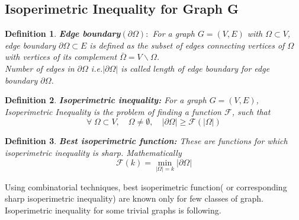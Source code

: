 \documentclass[oneside]{book}
\newtheorem{mydef}{Definition}[section]
\begin{document}
	
	 
	 
	 
	 
	 
	 
	 

	
	
	

	
	
	
	
	
	
 

	
	\subsection{Isoperimetric Inequality for Graph G}
	\begin{mydef}{\textbf{Edge boundary\( (\partial \Omega): \)}}
		For a graph \( G = (V,E) \) with \( \Omega \subset V \), edge boundary \( \partial \Omega \subset E \) is defined as the subset of edges connecting vertices of $\Omega$ with vertices of its complement $\bar{\Omega} = V \backslash \Omega $.\\
		Number of edges in $\partial \Omega $ i.e.$ | \partial \Omega | $ is called length of edge boundary for edge boundary   $\partial \Omega $.
	\end{mydef}
	
	\begin{mydef}{\textbf{Isoperimetric inequality:}}
		For a graph \( G = (V,E) \), Isoperimetric Inequality is the problem of finding a function $\mathcal{F}$, such that
		\begin{equation*}
			\forall \hspace{3pt} \Omega \subset V, \quad \Omega \neq \emptyset, \quad  |\partial \Omega| \geq \mathcal{F}(|\Omega|)
		\end{equation*}
	\end{mydef}
	
	\begin{mydef}{\textbf{Best isoperimetric function:}}
		These are functions for which isoperimetric inequality is sharp. Mathematically
		\begin{equation*}
			\mathcal{F}(k)=\min _{|\Omega|=k}|\partial \Omega|
		\end{equation*}
	\end{mydef}
	Using combinatorial techniques, best isoperimetric function( or corresponding sharp isoperimetric inequality) are known only for few classes of graph. \\ Isoperimetric inequality for some trivial graphs is following.
	
\end{document}
